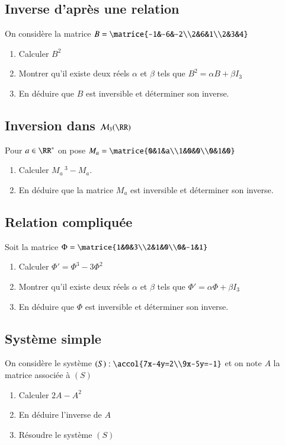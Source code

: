 \documentclass[oneside,12pt]{article}          %
\begin{document}
\subsection{Inverse d'après une relation}
On considère la matrice $B=\matrice{-1&-6&-2\\2&6&1\\2&3&4} $
    \begin{enumerate}
        \item Calculer $B^2$
        \item Montrer qu'il existe deux réels $\alpha$ et $\beta$ tels que $B^2=\alpha B+\beta I_3$
        \item En déduire que $B$ est inversible et déterminer son inverse.
    \end{enumerate}



\subsection{Inversion dans $\mathcal{M}_3(\RR)$}
Pour $a\in\RR^*$ on pose $M_a=\matrice{0&1&a\\1&0&0\\0&1&0}$
\begin{enumerate}
	\item Calculer $M_a\,^3-M_a$. 
	\item En déduire que la matrice $M_a$ est inversible et déterminer son inverse.
\end{enumerate}



\subsection{Relation compliquée}
Soit la matrice $\Phi=\matrice{1&0&3\\2&1&0\\0&-1&1} $
    \begin{enumerate}
        \item Calculer $\Phi'=\Phi^3-3\Phi^2$
        \item Montrer qu'il existe deux réels $\alpha$ et $\beta$ tels que $\Phi'=\alpha\Phi+\beta I_3$
        \item En déduire que $\Phi$ est inversible et déterminer son inverse.
    \end{enumerate}



\subsection{Système simple}
On considère le système $(S):\accol{7x-4y=2\\9x-5y=-1} $ et on note $A$ la matrice associée à $(S)$
    \begin{enumerate}
        \item Calculer $2A-A^2$
        \item En déduire l'inverse de $A$
        \item Résoudre le système $(S)$
    \end{enumerate}
    
\end{document}
